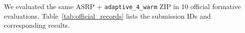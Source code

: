 We evaluated the same ASRP + \texttt{adaptive\_4\_warm} ZIP in 10 official formative evaluations. Table~\ref{tab:official_records} lists the submission IDs and corresponding results.
